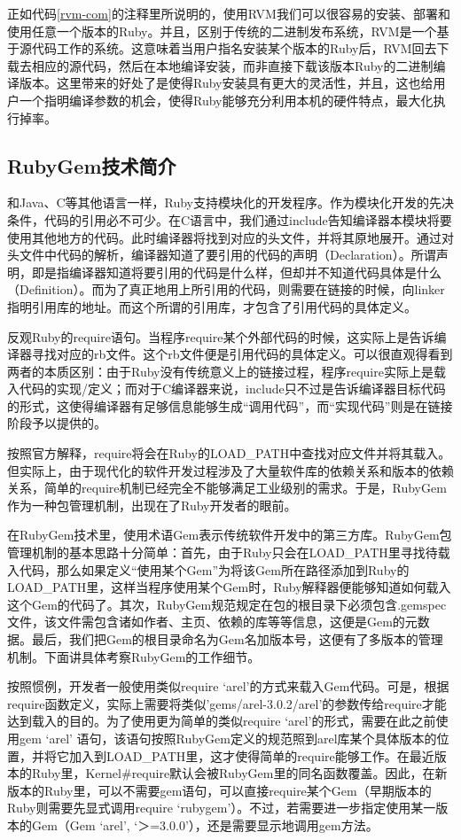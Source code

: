 正如代码\ref{rvm-com}的注释里所说明的，使用RVM我们可以很容易的安装、部署和使用任意一个版本的Ruby。并且，区别于传统的二进制发布系统，RVM是一个基于源代码工作的系统。这意味着当用户指名安装某个版本的Ruby后，RVM回去下载去相应的源代码，然后在本地编译安装，而非直接下载该版本Ruby的二进制编译版本。这里带来的好处了是使得Ruby安装具有更大的灵活性，并且，这也给用户一个指明编译参数的机会，使得Ruby能够充分利用本机的硬件特点，最大化执行掉率。

\subsection{RubyGem技术简介}
和Java、C等其他语言一样，Ruby支持模块化的开发程序。作为模块化开发的先决条件，代码的引用必不可少。在C语言中，我们通过include告知编译器本模块将要使用其他地方的代码。此时编译器将找到对应的头文件，并将其原地展开。通过对头文件中代码的解析，编译器知道了要引用的代码的声明（Declaration）。所谓声明，即是指编译器知道将要引用的代码是什么样，但却并不知道代码具体是什么（Definition）。而为了真正地用上所引用的代码，则需要在链接的时候，向linker指明引用库的地址。而这个所谓的引用库，才包含了引用代码的具体定义。

反观Ruby的require语句。当程序require某个外部代码的时候，这实际上是告诉编译器寻找对应的rb文件。这个rb文件便是引用代码的具体定义。可以很直观得看到两者的本质区别：由于Ruby没有传统意义上的链接过程，程序require实际上是载入代码的实现/定义；而对于C编译器来说，include只不过是告诉编译器目标代码的形式，这使得编译器有足够信息能够生成“调用代码”，而“实现代码”则是在链接阶段予以提供的。

按照官方解释，require将会在Ruby的LOAD\_PATH中查找对应文件并将其载入。但实际上，由于现代化的软件开发过程涉及了大量软件库的依赖关系和版本的依赖关系，简单的require机制已经完全不能够满足工业级别的需求。于是，RubyGem作为一种包管理机制，出现在了Ruby开发者的眼前。

在RubyGem技术里，使用术语Gem表示传统软件开发中的第三方库。RubyGem包管理机制的基本思路十分简单：首先，由于Ruby只会在LOAD\_PATH里寻找待载入代码，那么如果定义“使用某个Gem”为将该Gem所在路径添加到Ruby的LOAD\_PATH里，这样当程序使用某个Gem时，Ruby解释器便能够知道如何载入这个Gem的代码了。其次，RubyGem规范规定在包的根目录下必须包含.gemspec文件，该文件需包含诸如作者、主页、依赖的库等等信息，这便是Gem的元数据。最后，我们把Gem的根目录命名为Gem名加版本号，这便有了多版本的管理机制。下面讲具体考察RubyGem的工作细节。

按照惯例，开发者一般使用类似require ‘arel’的方式来载入Gem代码。可是，根据require函数定义，实际上需要将类似’gems/arel-3.0.2/arel’的参数传给require才能达到载入的目的。为了使用更为简单的类似require ‘arel’的形式，需要在此之前使用gem ‘arel’ 语句，该语句按照RubyGem定义的规范照到arel库某个具体版本的位置，并将它加入到LOAD\_PATH里，这才使得简单的require能够工作。在最近版本的Ruby里，Kernel\#require默认会被RubyGem里的同名函数覆盖。因此，在新版本的Ruby里，可以不需要gem语句，可以直接require某个Gem（早期版本的Ruby则需要先显式调用require ‘rubygem’）。不过，若需要进一步指定使用某一版本的Gem（Gem ‘arel’, ‘＞=3.0.0’），还是需要显示地调用gem方法。

